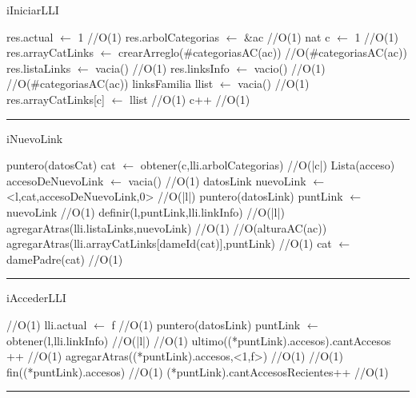 \begin{algorithm}[H]
\caption{iIniciarLLI}
\begin{algorithmic}[1]
\state res.actual $\gets$ 1 \hfill//O(1)
\state res.arbolCategorias $\gets$ \&ac \hfill //O(1)
\state nat c $\gets$ 1 \hfill //O(1)
\state res.arrayCatLinks $\gets$ crearArreglo(\#categoriasAC(ac)) \hfill //O(\#categoriasAC(ac))
\state res.listaLinks $\gets$ vacia() \hfill //O(1)
\state res.linksInfo $\gets$ vacio() \hfill //O(1)
 \hfill //O(\#categoriasAC(ac))
\state linksFamilia llist $\gets$ vacia() \hfill //O(1)
\state res.arrayCatLinks[c] $\gets$ llist \hfill //O(1)
\state c++ \hfill //O(1)
\endwhile
\EndFunction 
\end{algorithmic}
\hrule
{}
\end{algorithm}

\begin{algorithm}[H]
\caption{iNuevoLink}
\begin{algorithmic}[1]
\state puntero(datosCat) cat $\gets$ obtener(c,lli.arbolCategorias) \hfill//O(|c|)
\state Lista(acceso) accesoDeNuevoLink $\gets$ vacia() \hfill //O(1)
\state datosLink nuevoLink $\gets$ <l,cat,accesoDeNuevoLink,0> \hfill //O(|l|)
\state puntero(datosLink) puntLink $\gets$ nuevoLink \hfill //O(1)
\state definir(l,puntLink,lli.linkInfo) \hfill //O(|l|)
\state agregarAtras(lli.listaLinks,nuevoLink) \hfill //O(1)
 \hfill //O(alturaAC(ac))
\state agregarAtras(lli.arrayCatLinks[dameId(cat)],puntLink) \hfill //O(1)
\state cat $\gets$ damePadre(cat) \hfill //O(1)
\endwhile
\EndFunction 
\end{algorithmic}
\hrule
{}
\end{algorithm}

\begin{algorithm}[H]
\caption{iAccederLLI}
\begin{algorithmic}[1]
 \hfill//O(1)
\state lli.actual $\gets$ f \hfill //O(1)
\endif
\state puntero(datosLink) puntLink $\gets$ obtener(l,lli.linkInfo) \hfill//O(|l|)
 \hfill//O(1)
\state ultimo((*puntLink).accesos).cantAccesos ++ \hfill //O(1)
\Else
\state agregarAtras((*puntLink).accesos,<1,f>) \hfill //O(1)
\endif
{} \hfill //O(1)
\state fin((*puntLink).accesos) \hfill //O(1)
\endif
\state (*puntLink).cantAccesosRecientes++ \hfill //O(1)
\EndFunction 
\end{algorithmic}
\hrule
{}
\end{algorithm}

